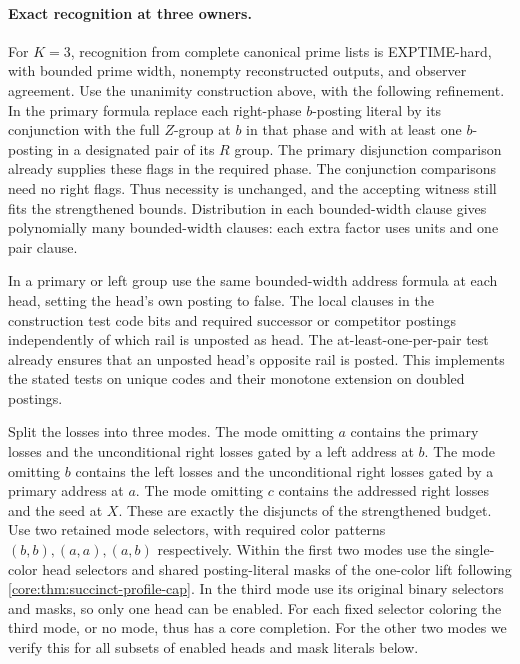 \paragraph{Exact recognition at three owners.}
For $K=3$, recognition from complete canonical prime lists
is EXPTIME-hard, with bounded prime width, nonempty
reconstructed outputs, and observer agreement. Use the
unanimity construction above, with the following refinement.
In the primary formula replace each right-phase $b$-posting
literal by its conjunction with the full $Z$-group at $b$
in that phase and with at least one $b$-posting in a designated
pair of its $R$ group. The primary disjunction comparison
already supplies these flags in the required phase. The
conjunction comparisons need no right flags. Thus necessity
is unchanged, and the accepting witness still fits the
strengthened bounds. Distribution in each bounded-width
clause gives polynomially many bounded-width clauses: each
extra factor uses units and one pair clause.

In a primary or left group use the same bounded-width
address formula at each head, setting the head's own
posting to false. The local clauses in the construction
test code bits and required successor or competitor
postings independently of which rail is unposted as head.
The at-least-one-per-pair test already ensures that an
unposted head's opposite rail is posted. This implements
the stated tests on unique codes and their monotone
extension on doubled postings.

Split the losses into three modes. The mode omitting $a$
contains the primary losses and the unconditional right
losses gated by a left address at $b$. The mode omitting $b$
contains the left losses and the unconditional right
losses gated by a primary address at $a$. The mode omitting
$c$ contains the addressed right losses and the seed at $X$.
These are exactly the disjuncts of the strengthened
budget. Use two retained mode selectors, with required
color patterns $(b,b),(a,a),(a,b)$ respectively. Within
the first two modes use the single-color head selectors
and shared posting-literal masks of the one-color lift
following \cref{core:thm:succinct-profile-cap}. In the third
mode use its original binary selectors and masks, so only
one head can be enabled. For each fixed selector coloring
the third mode, or no mode, thus has a core completion.
For the other two modes we verify this for all subsets of
enabled heads and mask literals below.

